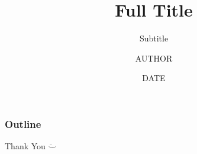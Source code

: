 \documentclass{beamer}
\title[\color{yellow}Short Title \hspace{4em} \insertframenumber\ of \inserttotalframenumber]{\color{yellow}Full Title}
\subtitle{\color{yellow}Subtitle}
\author{AUTHOR}
\institute{INSTITUTE}
\date{DATE}
\begin{document}
\frame{\maketitle}

\begin{frame}
	\frametitle{\color{yellow}Outline}
	\tableofcontents
\end{frame}









\begin{frame}
	\begin{center}
		\Huge Thank You $\ddot\smile$
	\end{center}
\end{frame}
\end{document}
